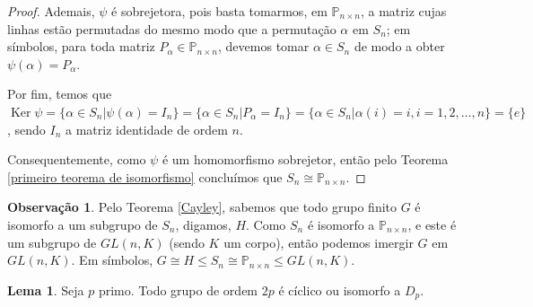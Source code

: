 \documentclass[a4paper,portuguese,11pt,twoside, leqno]{book}
\DeclareMathOperator{\Ker}{Ker}
\theoremstyle{definition}
\newtheorem{lemma}[theorem]{Lema}
\newtheorem{remark}{Observação}[section]
\begin{document}
\begin{proof}
		\par\vspace{0.3cm}
		
		Ademais, $\psi$ é sobrejetora, pois basta tomarmos, em $\mathbb{P}_{n\times n}$, a matriz cujas linhas estão permutadas do mesmo modo que a permutação $\alpha$ em $S_n$; em símbolos, para toda matriz $P_{\alpha}\in\mathbb{P}_{n\times n}$, devemos tomar $\alpha\in S_n$ de modo a obter $\psi(\alpha) = P_{\alpha}$. 
		
		\par\vspace{0.3cm}
		
		Por fim, temos que $\Ker\psi = \{ \alpha\in S_n | \psi(\alpha) = I_n \} = \{ \alpha\in S_n | P_{\alpha} = I_n \} = \{ \alpha\in S_n | \alpha(i) = i, i=1,2,\dots,n \} = \{e\}$, sendo $I_n$ a matriz identidade de ordem $n$.
		
		\par\vspace{0.3cm}
		
		Consequentemente, como $\psi$ é um homomorfismo sobrejetor, então pelo Teorema \eqref{primeiro teorema de isomorfismo} concluímos que $S_n\cong\mathbb{P}_{n\times n}$.
	\end{proof}
	
	\par\vspace{0.3cm}
	
	\begin{remark}
		Pelo Teorema \eqref{Cayley}, sabemos que todo grupo finito $G$ é isomorfo a um subgrupo de $S_n$, digamos, $H$. Como $S_n$ é isomorfo a $\mathbb{P}_{n\times n}$, e este é um subgrupo de $GL(n,K)$ (sendo $K$ um corpo), então podemos imergir $G$ em $GL(n,K)$. Em símbolos, $G\cong H\leq S_n\cong\mathbb{P}_{n\times n}\leq GL(n,K)$.
	\end{remark}
	
	\par\vspace{0.3cm}
	
	\begin{lemma}
		\label{grupos de ordem 2p}
		Seja $p$ primo. Todo grupo de ordem $2p$ é cíclico ou isomorfo a $D_p$.
	\end{lemma}
	
\end{document}
